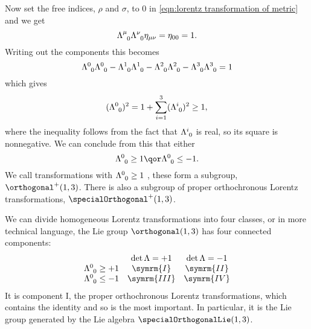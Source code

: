 \documentclass[fleqn]{NotesClass}
\newcommand{\minkowskiMetric}{\eta}
\begin{document}
\begin{appendices}
        Now set the free indices, \(\rho\) and \(\sigma\), to 0 in \cref{eqn:lorentz transformation of metric} and we get
        \begin{equation}
            \tensor{\Lambda}{^\mu_0} \tensor{\Lambda}{^\nu_0} \minkowskiMetric_{\mu\nu} = \minkowskiMetric_{00} = 1.
        \end{equation}
        Writing out the components this becomes
        \begin{equation}
            \tensor{\Lambda}{^0_0} \tensor{\Lambda}{^0_0} - \tensor{\Lambda}{^1_0}\tensor{\Lambda}{^1_0} - \tensor{\Lambda}{^2_0}\tensor{\Lambda}{^2_0} - \tensor{\Lambda}{^3_0}\tensor{\Lambda}{^3_0} = 1
        \end{equation}
        which gives
        \begin{equation}
            (\tensor{\Lambda}{^0_0})^2 = 1 + \sum_{i = 1}^{3} (\tensor{\Lambda}{^i_0})^2 \ge 1,
        \end{equation}
        where the inequality follows from the fact that \(\tensor{\Lambda}{^i_0}\) is real, so its square is nonnegative.
        We can conclude from this that either
        \begin{equation}
            \tensor{\Lambda}{^0_0} \ge 1 \qor \tensor{\Lambda}{^0_0} \le -1.
        \end{equation}
        We call transformations with \(\tensor{\Lambda}{^0_0} \ge 1\) , these form a subgroup, \(\orthogonal^+(1, 3)\).
        There is also a subgroup of proper orthochronous Lorentz transformations, \(\specialOrthogonal^+(1, 3)\).
        
        We can divide homogeneous Lorentz transformations into four classes, or in more technical language, the Lie group \(\orthogonal(1, 3)\) has four connected components:
        \begin{equation}
            \begin{array}{ccc}
                & \det \Lambda = + 1 & \det \Lambda = -1\\
                \tensor{\Lambda}{^0_0} \ge +1 & \symrm{I} & \symrm{II}\\
                \tensor{\Lambda}{^0_0} \le -1 & \symrm{III} & \symrm{IV}
            \end{array}
        \end{equation}
        It is component I, the proper orthochronous Lorentz transformations, which contains the identity and so is the most important.
        In particular, it is the Lie group generated by the Lie algebra \(\specialOrthogonalLie(1, 3)\).
        

\end{appendices}
\end{document}
